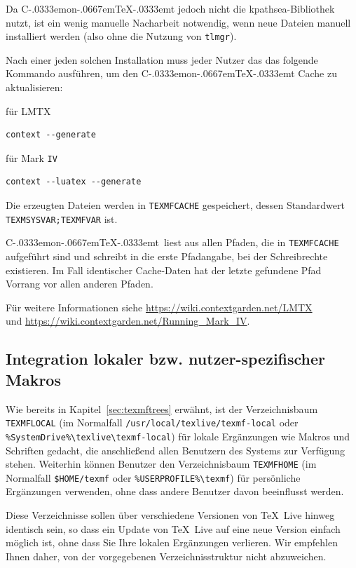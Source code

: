 \documentclass[12pt,ngerman,a4paper,fullparskip]{report}
\newcommand{\TL}{\TeX\ Live\xspace}
\newcommand{\acro}[1]{\texttt{#1}}
\newcommand{\code}[1]{\texttt{#1}}
\newcommand{\dirname}[1]{\texttt{#1}}
\newcommand\ConTeXt{C\kern-.0333emon\-\kern-.0667em\TeX\kern-.0333emt}
\begin{document}
Da \ConTeXt{}  jedoch nicht die kpathsea-Bibliothek nutzt, ist
ein wenig manuelle Nacharbeit notwendig, wenn neue Dateien manuell installiert werden (also ohne die Nutzung von \verb+tlmgr+).

Nach einer jeden solchen Installation muss jeder Nutzer das das folgende Kommando ausführen, um den \ConTeXt{} Cache zu aktualisieren:

für LMTX

\begin{verbatim}
context --generate
\end{verbatim}

für Mark \acro{IV}

\begin{verbatim}
context --luatex --generate
\end{verbatim}



Die erzeugten Dateien werden in \code{TEXMFCACHE} gespeichert, dessen Standardwert \verb+TEXMSYSVAR;TEXMFVAR+ ist. 

\ConTeXt\ liest aus allen Pfaden, die in \verb+TEXMFCACHE+ aufgeführt sind und schreibt in die erste Pfadangabe, bei der Schreibrechte existieren. Im Fall identischer Cache-Daten hat der letzte gefundene Pfad Vorrang vor allen anderen Pfaden.

Für weitere Informationen siehe \url{https://wiki.contextgarden.net/LMTX}\\
und \url{https://wiki.contextgarden.net/Running_Mark_IV}.

\subsection{Integration lokaler bzw. nutzer-spezifischer Makros}
\label{sec:local-personal-macros}

Wie bereits in Kapitel~\ref{sec:texmftrees} erwähnt, ist der Verzeichnisbaum \dirname{TEXMFLOCAL} (im Normalfall \dirname{/usr/local/texlive/texmf-local} oder \verb|%SystemDrive%\texlive\|\newline \verb|texmf-local|) für lokale Ergänzungen wie Makros und Schriften gedacht, die anschließend allen Benutzern des Systems zur Verfügung stehen. Weiterhin können Benutzer den Verzeichnisbaum \dirname{TEXMFHOME} (im Normalfall \dirname{\$HOME/texmf} oder \verb|%USERPROFILE%\texmf|) für persönliche Ergänzungen verwenden, ohne dass andere Benutzer davon beeinflusst werden.

Diese Verzeichnisse sollen über verschiedene Versionen von \TL hinweg identisch sein, so dass ein Update von \TL auf eine neue Version einfach möglich ist, ohne dass Sie Ihre lokalen Ergänzungen verlieren. Wir empfehlen Ihnen daher, von der vorgegebenen Verzeichnisstruktur nicht abzuweichen.
\end{document}
